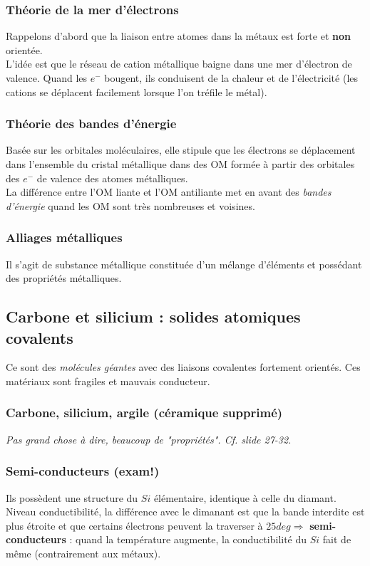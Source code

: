 \documentclass[12pt, a4paper]{article}
\begin{document}
\subsubsection*{Théorie de la mer d'électrons}
Rappelons d'abord que la liaison entre atomes dans la métaux est forte et \textbf{non} orientée.\\

L'idée est que le réseau de cation métallique baigne dans une mer d'électron de valence. Quand les $e^-$ bougent, ils conduisent de la chaleur et de l'électricité (les cations se déplacent facilement lorsque l'on tréfile le métal).

\subsubsection*{Théorie des bandes d'énergie}
Basée sur les orbitales moléculaires, elle stipule que les électrons se déplacement dans l'ensemble du cristal métallique dans des OM formée à partir des orbitales des $e^-$ de valence des atomes métalliques.\\
La différence entre l'OM liante et l'OM antiliante met en avant des \textit{bandes d'énergie} quand les OM sont très nombreuses et voisines.

\subsubsection*{Alliages métalliques}
Il s'agit de substance métallique constituée d'un mélange d'éléments et possédant des propriétés métalliques.


\subsection{Carbone et silicium : solides atomiques covalents}
Ce sont des \textit{molécules géantes} avec des liaisons covalentes fortement orientés. Ces matériaux sont fragiles et mauvais conducteur.

\subsubsection*{Carbone, silicium, argile (céramique supprimé)}
\textit{Pas grand chose à dire, beaucoup de "propriétés". Cf. slide 27-32.}

\subsubsection*{Semi-conducteurs (exam!)}
Ils possèdent une structure du $Si$ élémentaire, identique à celle du diamant. Niveau conductibilité, la différence avec le dimanant est que la bande interdite est plus étroite et que certains électrons peuvent la traverser à $25deg \Rightarrow$ \textbf{semi-conducteurs} : quand la température augmente, la conductibilité du $Si$ fait de même (contrairement aux métaux).\\
\end{document}
